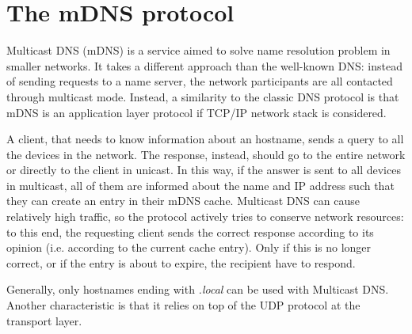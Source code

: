 \documentclass[fleqn, 11pt]{SelfArx} %
\begin{document}

\section{The mDNS protocol}
Multicast DNS (mDNS) is a service aimed to solve name resolution problem in smaller networks. It takes a different approach than the well-known DNS: instead of sending requests to a name server, the network participants are all contacted through multicast mode. \newline
Instead, a similarity to the classic DNS protocol is that mDNS is an application layer protocol if TCP/IP network stack is considered. \newline %


A client, that needs to know information about an hostname, sends a query to all the devices in the network. The response, instead, should go to the entire network or directly to the client in unicast. In this way, if the answer is sent to all devices in multicast, all of them are informed about the name and IP address such that they can create an entry in their mDNS cache. \newline
Multicast DNS can cause relatively high traffic, so the protocol actively tries to conserve network resources: to this end, the requesting client sends the correct response according to its opinion (i.e. according to the current cache entry). Only if this is no longer correct, or if the entry is about to expire, the recipient have to respond. \newline

Generally, only hostnames ending with {\it{.local}} can be used with Multicast DNS. Another characteristic is that it relies on top of the UDP protocol at the transport layer.\newline
\end{document}
